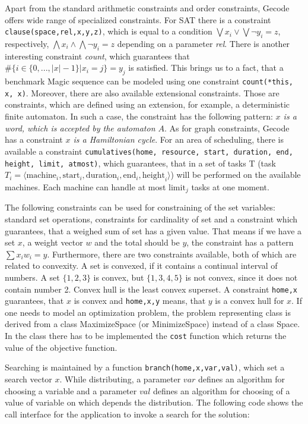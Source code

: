 Apart from the standard arithmetic constraints and order constraints, Gecode offers
wide range of specialized constraints. For SAT there is a constraint \texttt{clause(space,rel,x,y,z)},
which is equal to a condition $\bigvee {x_i} \vee \bigvee{\neg y_i} = z$, respectively, $\bigwedge {x_i} \wedge \bigwedge{\neg y_i} = z$
depending on a parameter {\em rel}. There is another interesting constraint {\em count}, which 
guarantees that $\#\{i \in \{0, ..., |x|-1\}|x_i = j\} = y_j$ is satisfied. This brings us to a fact,
that a benchmark Magic sequence can be modeled using one constraint \texttt{count(*this, x, x)}.
Moreover, there are also available extensional constraints. Those are constraints, which are 
defined using an extension, for example, a deterministic finite automaton. In such a case, the constraint
has the following pattern:  {\em $x$ is a word, which is accepted by the automaton $A$}. As for graph constraints, 
Gecode has a constraint {\em $x$ is a Hamiltonian cycle}. For an area of scheduling, there is available
a constraint \texttt{cumulatives(home, resource, start, duration, end, height, limit, atmost)}, which
guarantees, that in a set of tasks T (task $T_i = \langle \mathrm{machine}_i, \mathrm{start}_i,
\mathrm{duration}_i, \mathrm{end}_i, \mathrm{height}_i \rangle$) will be performed on 
the available machines. Each machine can handle at most $\mathrm{limit}_j$ tasks at
one moment.

The following constraints can be used for constraining of the set variables: standard 
set operations, constraints for cardinality of set and a constraint
which guarantees, that a weighed sum of set has a given value. That means if we have a set $x$, 
a weight vector $w$ and the total should be $y$, the constraint has a pattern $\sum{x_i w_i} = y$. 
Furthermore, there are two constraints available, both of which are related to convexity. A set is convexed, 
if it contains a continual interval of numbers. A set $\{1,2,3\}$ is convex, but $\{1,3,4,5\}$ is not 
convex, since it does not contain number 2. Convex hull is the least convex superset. A constraint
\texttt{home,x} guarantees, that $x$ is convex and \texttt{home,x,y} means, that $y$ is a convex hull for $x$.
If one needs to model an optimization problem, the problem representing class is derived from a class MaximizeSpace (or MinimizeSpace)
instead of a class Space. In the class there has to be implemented the \texttt{cost} function which returns
the value of the objective function. 

Searching is maintained by a function \texttt{branch(home,x,var,val)}, which set a search vector $x$. While distributing,
a parameter $var$ defines an algorithm for choosing a variable and a parameter $val$ defines an algorithm
for choosing of a value of variable on which depends the distribution. The following code shows the call interface
for the application to invoke a search for the solution: 

